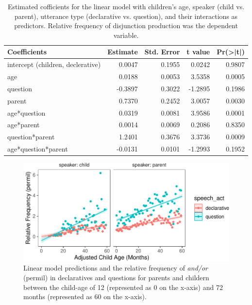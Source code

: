 \documentclass[
  ,man,floatsintext]{apa6}
\begin{document}
\begin{table}

\caption{\label{tab:study1coeftable}Estimated cofficients for the linear model with children's age, speaker (child vs. parent), utterance type (declarative vs. question), and their interactions as predictors. Relative frequency of disjunction production was the dependent variable.}
\centering
\fontsize{9}{11}\selectfont
\begin{tabular}[t]{l|r|r|r|r}
\hline
Coefficients & Estimate & Std. Error & t value & Pr(>|t|)\\
\hline
intercept (children, declerative) & 0.0047 & 0.1955 & 0.0242 & 0.9807\\
\hline
age & 0.0188 & 0.0053 & 3.5358 & 0.0005\\
\hline
question & -0.3897 & 0.3022 & -1.2895 & 0.1986\\
\hline
parent & 0.7370 & 0.2452 & 3.0057 & 0.0030\\
\hline
age*question & 0.0319 & 0.0081 & 3.9586 & 0.0001\\
\hline
age*parent & 0.0014 & 0.0069 & 0.2086 & 0.8350\\
\hline
question*parent & 1.2401 & 0.3676 & 3.3736 & 0.0009\\
\hline
age*question*parent & -0.0131 & 0.0101 & -1.2993 & 0.1952\\
\hline
\end{tabular}
\end{table}

\begin{figure}[H]

{\centering \includegraphics{figs/disjunctionPrediction-1} 

}

\caption{Linear model predictions and the relative frequency of \textit{and/or} (permil) in declaratives and questions for parents and childern between the child-age of 12 (represented as 0 on the x-axis) and 72 months (represented as 60 on the x-axis).}\label{fig:disjunctionPrediction}
\end{figure}
\end{document}
